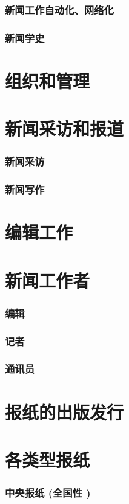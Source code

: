 \documentclass[UTF8]{../../ApplicationUniverse}
\begin{document}
    \subsubsection{新闻工作自动化、网络化}
    \subsubsection{新闻学史}
\section{组织和管理}
\section{新闻采访和报道}
    \subsubsection{新闻采访}
    \subsubsection{新闻写作}
\section{编辑工作}
\section{新闻工作者}
    \subsubsection{编辑}
    \subsubsection{记者}
    \subsubsection{通讯员}
\section{报纸的出版发行}
\section{各类型报纸}
    \subsubsection{中央报纸 (全国性 )}
\end{document}
